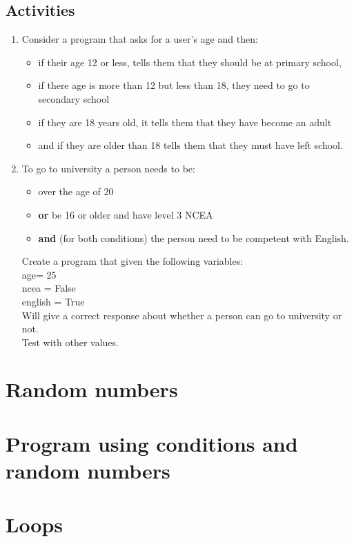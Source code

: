 \documentclass[a4paper,12pt]{article}
\begin{document}
\subsection{Activities}
\begin{enumerate}
	\item Consider a program that asks for a user’s age and then:
\begin{itemize}
	\item if their age 12 or less, tells them that they should be at primary school,
	\item if there age is more than 12 but less than 18, they need to go to secondary school
	\item if they are 18 years old, it tells them that they have become an adult
	\item and if they are older than 18 tells them that they must have left school.
\end{itemize}
\item 	To go to university a person needs to be:
\begin{itemize}
	\item over the age of 20
	\item \textbf{or} be 16 or older and have level 3 NCEA 
	\item \textbf{and} (for both conditions) the person need to be competent with English.
\end{itemize} 
Create a program that given the following variables:\\
age= 25\\
ncea = False\\
english = True\\
Will give a correct response about whether a person can go to university or not.\\
Test with other values.
\end{enumerate}

\newpage
\section{Random numbers}

\section{Program using conditions and random numbers}

\newpage
\section{Loops}
\end{document}

